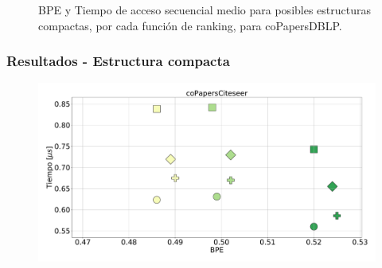 \begin{frame}
\begin{figure}
\begin{minipage}{1\textwidth}
\begin{minipage}{0.15\textwidth}
    		\end{minipage}	
    	\end{minipage}

	\caption{BPE y Tiempo de acceso secuencial medio para posibles estructuras compactas, por cada función de ranking, para coPapersDBLP.}
\end{figure}

\end{frame}

\begin{frame}
\frametitle{Resultados - Estructura compacta}

\begin{figure}
	\centering
	
    	\begin{minipage}{1\textwidth}
    		\centering
    		\begin{minipage}{0.8\textwidth}
    			\centering
    			\includegraphics[width=1\linewidth]{../img/sdsl/secuencialBig/coPapersCiteseer.pdf}
    		\end{minipage}
    		\begin{minipage}{0.15\textwidth}
    			\centering

\end{minipage}
\end{minipage}
\end{figure}
\end{frame}

